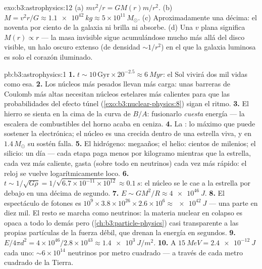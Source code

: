 \begin{solution}{exo:b3:astrophysics:12}
(a) $mv^2/r = GM(r)m/r^2$. (b) $M = v^2r/G \approx
\qty{1.1e42}{kg} \approx 5\times10^{11}\,M_\odot$. (c) Aproximadamente
una décima: el noventa por ciento de la galaxia ni brilla ni
absorbe. (d) Una $v$ plana significa $M(r) \propto r$ --- la masa
invisible sigue acumulándose mucho más allá del disco visible, un
halo oscuro extenso (de densidad $\sim1/r^2$) en el que la galaxia
luminosa es solo el corazón iluminado.
\end{solution}

\begin{solution}{pb:b3:astrophysics:1}
\textbf{1.} $t \sim 10\,\text{Gyr}\times20^{-2.5} \approx
\qty{6}{Myr}$: el Sol vivirá dos mil vidas como esa.
\textbf{2.} Los núcleos más pesados llevan más carga: unas barreras de Coulomb
más altas necesitan núcleos estelares más calientes para que las probabilidades del efecto túnel
(\cref{exo:b3:nuclear-physics:8}) sigan el ritmo.
\textbf{3.} El hierro se sienta en la cima de la curva de $B/A$: fusionarlo
\emph{cuesta} energía --- la escalera de combustibles del horno acaba en ceniza.
\textbf{4.} La : lo máximo que puede sostener la  electrónica; el núcleo es una  crecida
dentro de una estrella viva, y en $1.4\,M_\odot$ su sostén falla.
\textbf{5.} El hidrógeno: megaaños; el helio: cientos de milenios;
el silicio: un día --- cada etapa paga menos por kilogramo mientras que la
estrella, cada vez más caliente, gasta (sobre todo en neutrinos) cada vez más rápido:
el reloj se vuelve logarítmicamente loco.
\textbf{6.} $t \sim 1/\sqrt{G\rho} =
1/\sqrt{6.7\times10^{-11}\times10^{12}} \approx \qty{0.1}{s}$:
el núcleo se le cae a la estrella por debajo en una décima de segundo.
\textbf{7.} $E \sim GM^2/R \approx \qty{4e46}{J}$.
\textbf{8.} El espectáculo de fotones es $10^9\times3.8\times10^{26}
\times2.6\times10^{6} \approx \qty{e42}{J}$ --- una parte en diez
mil. El resto se marcha como neutrinos: la materia nuclear en colapso
es opaca a todo lo demás pero
(\cref{ch:b3:particle-physics}) casi transparente a las propias partículas
de la fuerza débil, que drenan la energía en segundos.
\textbf{9.} $E/4\pi d^2 = 4\times10^{46}/2.8\times10^{43}
\approx \qty{1.4e3}{J/m^2}$.
\textbf{10.} A $\qty{15}{MeV} = \qty{2.4e-12}{J}$ cada uno:
${\sim}6\times10^{14}$ neutrinos por metro cuadrado --- a través de
cada metro cuadrado de la Tierra.

\end{solution}
